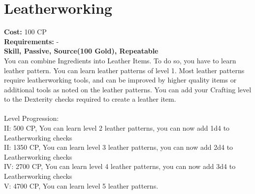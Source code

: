 \section{Leatherworking}\label{perk:leatherworking}
\textbf{Cost:} 100 CP\\
\textbf{Requirements:} -\\
\textbf{Skill, Passive, Source(100 Gold), Repeatable}\\
You can combine Ingredients into Leather Items.
To do so, you have to learn leather pattern.
You can learn leather patterns of level 1.
Most leather patterns require leatherworking tools, and can be improved by higher quality items or additional tools as noted on the leather patterns.
You can add your Crafting level to the Dexterity checks required to create a leather item.\\
\\
Level Progression:\\
II: 500 CP, You can learn level 2 leather patterns, you can now add 1d4 to Leatherworking checks\\
II: 1350 CP, You can learn level 3 leather patterns, you can now add 2d4 to Leatherworking checks\\
IV: 2700 CP, You can learn level 4 leather patterns, you can now add 3d4 to Leatherworking checks\\
V: 4700 CP, You can learn level 5 leather patterns.\\